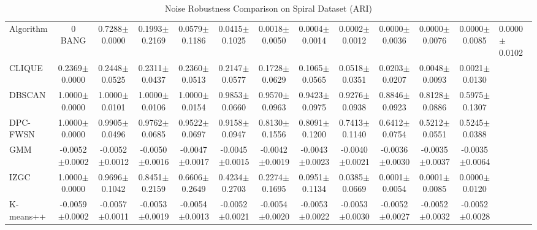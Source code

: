 \begin{table}[ht!]
\centering
\caption{Noise Robustness Comparison on Spiral Dataset (ARI)}
\label{tab:noise_spiral_comparison}
\begin{tabular*}{\linewidth}{@{} lccccccccccc @{}}
\toprule
Algorithm & 0%
\midrule
BANG & 0.7288$\pm$0.0000 & 0.1993$\pm$0.2169 & 0.0579$\pm$0.1186 & 0.0415$\pm$0.1025 & 0.0018$\pm$0.0050 & 0.0004$\pm$0.0014 & 0.0002$\pm$0.0012 & 0.0000$\pm$0.0036 & 0.0000$\pm$0.0076 & 0.0000$\pm$0.0085 & 0.0000$\pm$0.0102 \\
CLIQUE & 0.2369$\pm$0.0000 & 0.2448$\pm$0.0525 & 0.2311$\pm$0.0437 & 0.2360$\pm$0.0513 & 0.2147$\pm$0.0577 & 0.1728$\pm$0.0629 & 0.1065$\pm$0.0565 & 0.0518$\pm$0.0351 & 0.0203$\pm$0.0207 & 0.0048$\pm$0.0093 & 0.0021$\pm$0.0130 \\
DBSCAN & 1.0000$\pm$0.0000 & 1.0000$\pm$0.0101 & 1.0000$\pm$0.0106 & 1.0000$\pm$0.0154 & 0.9853$\pm$0.0660 & 0.9570$\pm$0.0963 & 0.9423$\pm$0.0975 & 0.9276$\pm$0.0938 & 0.8846$\pm$0.0923 & 0.8128$\pm$0.0886 & 0.5975$\pm$0.1307 \\
DPC-FWSN & 1.0000$\pm$0.0000 & 0.9905$\pm$0.0496 & 0.9762$\pm$0.0685 & 0.9522$\pm$0.0697 & 0.9158$\pm$0.0947 & 0.8130$\pm$0.1556 & 0.8091$\pm$0.1200 & 0.7413$\pm$0.1140 & 0.6412$\pm$0.0754 & 0.5212$\pm$0.0551 & 0.5245$\pm$0.0388 \\
GMM & -0.0052$\pm$0.0002 & -0.0052$\pm$0.0012 & -0.0050$\pm$0.0016 & -0.0047$\pm$0.0017 & -0.0045$\pm$0.0015 & -0.0042$\pm$0.0019 & -0.0043$\pm$0.0023 & -0.0040$\pm$0.0021 & -0.0036$\pm$0.0030 & -0.0035$\pm$0.0037 & -0.0035$\pm$0.0064 \\
IZGC & 1.0000$\pm$0.0000 & 0.9696$\pm$0.1042 & 0.8451$\pm$0.2159 & 0.6606$\pm$0.2649 & 0.4234$\pm$0.2703 & 0.2274$\pm$0.1695 & 0.0951$\pm$0.1134 & 0.0385$\pm$0.0669 & 0.0001$\pm$0.0054 & 0.0001$\pm$0.0085 & 0.0000$\pm$0.0120 \\
K-means++ & -0.0059$\pm$0.0002 & -0.0057$\pm$0.0011 & -0.0053$\pm$0.0019 & -0.0054$\pm$0.0013 & -0.0052$\pm$0.0021 & -0.0054$\pm$0.0020 & -0.0053$\pm$0.0022 & -0.0053$\pm$0.0030 & -0.0052$\pm$0.0027 & -0.0052$\pm$0.0032 & -0.0052$\pm$0.0028 \\
\bottomrule
\end{tabular*}
\end{table}